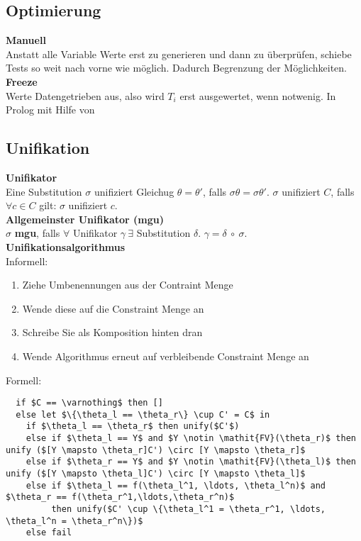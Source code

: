 \subsection{Optimierung}%
\label{lp:sub:optimierung}
\textbf{Manuell}\\
Anstatt alle Variable Werte erst zu generieren und dann zu überprüfen, schiebe Tests so weit nach vorne wie möglich.
Dadurch Begrenzung der Möglichkeiten.\\

\textbf{Freeze}\\
Werte Datengetrieben aus, also wird \(T_i\) erst ausgewertet, wenn notwenig.
In Prolog mit Hilfe von 

\subsection{Unifikation}%
\label{lp:sub:unifikation}
\textbf{Unifikator}\\
Eine Substitution \(\sigma\) unifiziert Gleichug \(\theta = \theta'\), falls \(\sigma\theta = \sigma\theta'\).
\(\sigma\) unifiziert \(C\), falls \(\forall c \in C\) gilt: \(\sigma\) unifiziert \(c\).\\
\textbf{Allgemeinster Unifikator (mgu)}\\
\(\sigma\) \textbf{mgu}, falls \(\forall\) Unifikator \(\gamma\ \exists\) Substitution \(\delta\). \( \gamma = \delta\ \circ\ \sigma\).\\

\textbf{Unifikationsalgorithmus}\\
Informell:
\begin{enumerate}
  \item Ziehe Umbenennungen aus der Contraint Menge
  \item Wende diese auf die Constraint Menge an
  \item Schreibe Sie als Komposition hinten dran
  \item Wende Algorithmus erneut auf verbleibende Constraint Menge an
\end{enumerate}
Formell:
\begin{lstlisting}
  if $C == \varnothing$ then []
  else let $\{\theta_l == \theta_r\} \cup C' = C$ in
    if $\theta_l == \theta_r$ then unify($C'$)
    else if $\theta_l == Y$ and $Y \notin \mathit{FV}(\theta_r)$ then unify ($[Y \mapsto \theta_r]C') \circ [Y \mapsto \theta_r]$
    else if $\theta_r == Y$ and $Y \notin \mathit{FV}(\theta_l)$ then unify ($[Y \mapsto \theta_l]C') \circ [Y \mapsto \theta_l]$
    else if $\theta_l == f(\theta_l^1, \ldots, \theta_l^n)$ and $\theta_r == f(\theta_r^1,\ldots,\theta_r^n)$
         then unify($C' \cup \{\theta_l^1 = \theta_r^1, \ldots, \theta_l^n = \theta_r^n\})$
    else fail
\end{lstlisting}
  
